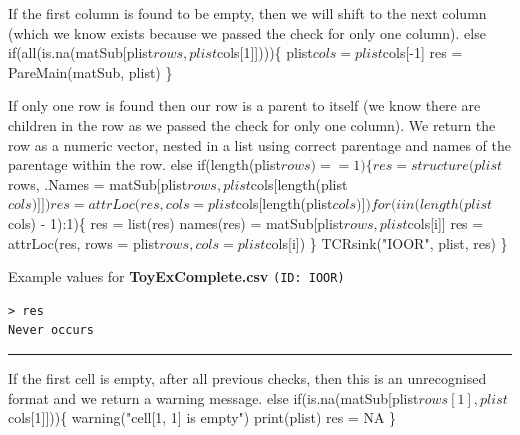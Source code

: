 \documentclass[a4paper]{article}
\begin{document}
If the first column is found to be empty, then we will shift to the
next column (which we know exists because we passed the check for only
one column).
\nwenddocs{}\endmoddef
else if(all(is.na(matSub[plist$rows, plist$cols[1]])))\{
  plist$cols = plist$cols[-1]
  res = PareMain(matSub, plist)
\}
\nwendcode{}\nwdocspar

If only one row is found then our row is a parent to itself (we know
there are children in the row as we passed the check for only one
column). We return the row as a numeric vector, nested in a list using
correct parentage and names of the parentage within the row.
\nwenddocs{}\endmoddef
else if(length(plist$rows) == 1)\{
  res = structure(plist$rows,
    .Names = matSub[plist$rows, plist$cols[length(plist$cols)]])
  res = attrLoc(res, cols = plist$cols[length(plist$cols)])
  for(i in (length(plist$cols) - 1):1)\{
    res = list(res)
    names(res) = matSub[plist$rows, plist$cols[i]]
    res = attrLoc(res, rows = plist$rows, cols = plist$cols[i])
  \}
  TCRsink("IOOR", plist, res)
\}
\nwendcode{}\nwdocspar

Example values for \textbf{ToyExComplete.csv} \texttt{(ID: IOOR)}
\begin{verbatim}
> res
Never occurs
\end{verbatim}
\vspace{-1.5em}
\noindent\rule{0.25\textwidth}{0.4pt}
\vspace{0.5em}

If the first cell is empty, after all previous checks, then this is an
unrecognised format and we return a warning message.
\nwenddocs{}\endmoddef
else if(is.na(matSub[plist$rows[1], plist$cols[1]]))\{
  warning("cell[1, 1] is empty")
  print(plist)
  res = NA
\}
\nwendcode{}\nwdocspar
\end{document}
